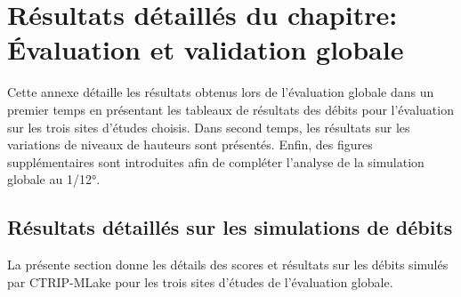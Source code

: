 \chapter{{\selectfont Résultats détaillés du chapitre: \'Evaluation et validation globale}}
\label{chap:resultats-etude-globale}

Cette annexe détaille les résultats obtenus lors de l'évaluation globale dans un premier temps en présentant les tableaux de résultats des débits pour l'évaluation sur les trois sites d'études choisis. Dans second temps, les résultats sur les variations de niveaux de hauteurs sont présentés. Enfin, des figures supplémentaires sont introduites afin de compléter l'analyse de la simulation globale au 1/12°.

\section{{\selectfont Résultats détaillés sur les simulations de débits}}
\label{chap:annexe_q_globe}

La présente section donne les détails des scores et résultats sur les débits simulés par CTRIP-MLake pour les trois sites d'études de l'évaluation globale.

